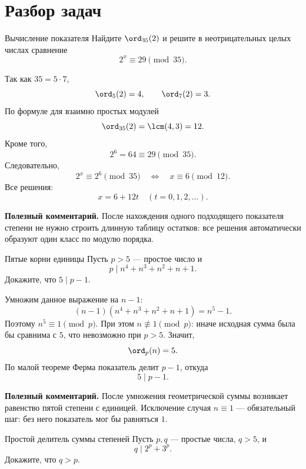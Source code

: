 \section{Разбор задач}

\begin{problembox}{Вычисление показателя}
Найдите $\ord_{35}(2)$ и решите в неотрицательных целых числах
сравнение
\[
  2^x\equiv29\pmod{35}.
\]
\end{problembox}

\begin{solutionbox}
Так как $35=5\cdot7$,
\[
  \ord_5(2)=4,
  \qquad
  \ord_7(2)=3.
\]
По формуле для взаимно простых модулей
\[
  \ord_{35}(2)=\lcm(4,3)=12.
\]
Кроме того,
\[
  2^6=64\equiv29\pmod{35}.
\]
Следовательно,
\[
  2^x\equiv2^6\pmod{35}
  \quad\Longleftrightarrow\quad
  x\equiv6\pmod{12}.
\]
Все решения:
\[
  \boxed{x=6+12t\quad(t=0,1,2,\ldots)}.
\]

\textbf{Полезный комментарий.}
После нахождения одного подходящего показателя степени не нужно строить
длинную таблицу остатков: все решения автоматически образуют один
класс по модулю порядка.
\end{solutionbox}

\begin{problembox}{Пятые корни единицы}
Пусть $p>5$ --- простое число и
\[
  p\mid n^4+n^3+n^2+n+1.
\]
Докажите, что $5\mid p-1$.
\end{problembox}

\begin{solutionbox}
Умножим данное выражение на $n-1$:
\[
  (n-1)(n^4+n^3+n^2+n+1)=n^5-1.
\]
Поэтому $n^5\equiv1\pmod p$. При этом $n\not\equiv1\pmod p$:
иначе исходная сумма была бы сравнима с $5$, что невозможно при
$p>5$. Значит,
\[
  \ord_p(n)=5.
\]
По малой теореме Ферма показатель делит $p-1$, откуда
\[
  \boxed{5\mid p-1}.
\]

\textbf{Полезный комментарий.}
После умножения геометрической суммы возникает равенство пятой степени
с единицей. Исключение случая $n\equiv1$ --- обязательный шаг: без него
показатель мог бы равняться $1$.
\end{solutionbox}

\begin{problembox}{Простой делитель суммы степеней}
Пусть $p,q$ --- простые числа, $q>5$, и
\[
  q\mid2^p+3^p.
\]
Докажите, что $q>p$.
\end{problembox}

